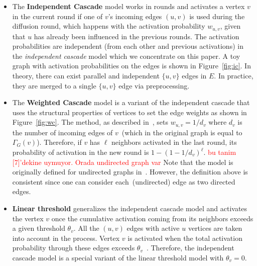 \documentclass[10pt,journal,compsoc]{IEEEtran}
\newcommand\kktodo[1]{\textcolor{red}{#1}}
\begin{document}
\begin{itemize}[leftmargin=*]
\item The {\bf Independent Cascade} model works in rounds and activates a vertex $v$ in the current round if one of $v$'s incoming edges $(u, v)$ is 
used during the diffusion round, which happens with the activation probability $w_{u, v}$, given that $u$ has already been influenced in the previous rounds. The activation probabilities are independent (from each other and previous activations) in the {\em independent cascade} model which we concentrate on this paper. A toy graph with activation probabilities on the edges is shown in Figure~\ref{fig:ic}.
In theory, there can exist parallel and independent $\{u, v\}$ edges in $E$. In practice, they are merged to a single $\{u,v\}$ edge via preprocessing. 

\item The {\bf Weighted Cascade}  model is a variant of the independent cascade that uses the structural properties of vertices to set the edge weights as shown in Figure~\ref{fig:wc}.
The method, as described in~\cite{kempe2003maximizing}, sets $w_{u, v} = 1 / d_v$ where $d_v$ is the number 
of incoming edges of $v$~(which in the original graph is equal to $\Gamma _G(v)$).
Therefore, if $v$ has $\ell$ neighbors activated in the last round, its probability of activation in the new round is $1-( 1-1 / d_v)^\ell$. 
\kktodo{bu tanim [7]'dekine uymuyor. Orada undirected graph var } Note that the model is originally defined for undirected graphs in~\cite{MixGreedy}. However, the definition above is consistent since one can consider each~(undirected) edge as two directed edges. 


\item{\bf Linear threshold} generalizes the independent cascade model and activates the vertex $v$ once the cumulative activation coming from its neighbors exceeds a given threshold $\theta_v$. 
All the $(u, v)$ edges with active $u$ vertices are taken into account in the process. Vertex $v$ is activated when the total activation probability through these edges exceeds $\theta_v$~\cite{kempe2003maximizing}.  
Therefore, the independent cascade model is a special variant of the linear threshold model with $\theta_v = 0$. 
\end{itemize}
\end{document}

